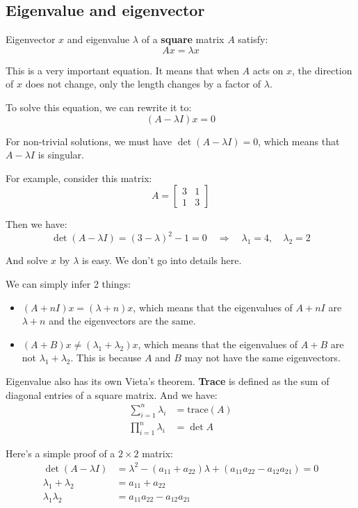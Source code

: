 \documentclass[12pt]{ctexart}
\begin{document}
\newpage
\subsection{\textbf{Eigenvalue and eigenvector}}

Eigenvector $x$ and eigenvalue $\lambda$ of a \textbf{square} matrix $A$ satisfy:
\[
  Ax = \lambda x
\]

This is a very important equation. It means that when $A$ acts on $x$, the direction of
$x$ does not change, only the length changes by a factor of $\lambda$.

To solve this equation, we can rewrite it to:
\[
  (A - \lambda I)x = 0
\]

For non-trivial solutions, we must have $\det(A - \lambda I) = 0$, which means that
$A - \lambda I$ is singular.

For example, consider this matrix:
\[
  A = \begin{bmatrix}
    3 & 1 \\
    1 & 3
  \end{bmatrix}
\]

Then we have:
\[
  \det(A - \lambda I) = (3 - \lambda)^2 - 1 = 0
  \quad \Rightarrow \quad
  \lambda_1 = 4, \quad \lambda_2 = 2
\]

And solve $x$ by $\lambda$ is easy. We don't go into details here.

We can simply infer 2 things:
\begin{itemize}
  \item $(A + nI) x = (\lambda + n) x$, which means that the eigenvalues of $A + nI$
  are $\lambda + n$ and the eigenvectors are the same.
  \item $(A + B) x \neq (\lambda_1  + \lambda_2) x$, which means that the eigenvalues
  of $A + B$ are not $\lambda_1 + \lambda_2$. This is because $A$ and $B$ may not
  have the same eigenvectors.
\end{itemize}

Eigenvalue also has its own Vieta's theorem. \textbf{Trace} is defined as the sum of
diagonal entries of a square matrix. And we have:
\begin{align*}
  \sum_{i=1}^{n} \lambda_i &= \text{trace}(A) \\
  \prod_{i=1}^{n} \lambda_i &= \det A
\end{align*}

Here's a simple proof of a $2 \times 2$ matrix:
\begin{align*}
  \det(A - \lambda I) &=
  \lambda^2 - (a_{11} + a_{22})\lambda + (a_{11}a_{22} - a_{12}a_{21}) = 0 \\
  \lambda_1 + \lambda_2 &= a_{11} + a_{22} \\
  \lambda_1 \lambda_2 &= a_{11}a_{22} - a_{12}a_{21}
\end{align*}
\end{document}
